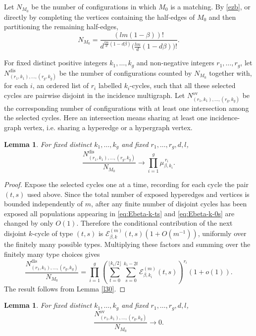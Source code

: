 \documentclass[11pt]{amsart}
\theoremstyle{plain}
\newtheorem{lemma}[theorem]{Lemma}
\numberwithin{equation}{section}
\numberwithin{theorem}{section}
\numberwithin{figure}{section}
\begin{document}
Let \(N_{M_0}\) be the number of configurations in which \(M_0\) is a matching.  By
\eqref{ezb}, or directly by completing the vertices containing the half-edges
of \(M_0\) and then partitioning the remaining half-edges,
\[
  N_{M_0}
  =\frac{(lm(1-\beta))!}
    {d^{\frac{lm}{d}(1-d\beta)}\bigl(\frac{lm}{d}(1-d\beta)\bigr)!}.
\]

For fixed distinct positive integers \(k_1,\ldots,k_g\) and non-negative integers
\(r_1,\ldots,r_g\), let \(N^{\mathrm{dis}}_{(r_1,k_1),\ldots,(r_g,k_g)}\) be the
number of configurations counted by \(N_{M_0}\) together with, for each \(i\), an
ordered list of \(r_i\) labelled \(k_i\)-cycles, such that all these selected cycles
are pairwise disjoint in the incidence multigraph.  Let
\(N^{\mathrm{ov}}_{(r_1,k_1),\ldots,(r_g,k_g)}\) be the corresponding number of
configurations with at least one intersection among the selected cycles.
Here an intersection means sharing at least one incidence-graph vertex, i.e.
sharing a hyperedge or a hypergraph vertex.

\begin{lemma}\label{l31}
For fixed distinct \(k_1,\ldots,k_g\) and fixed \(r_1,\ldots,r_g,d,l\),
\[
  \frac{N^{\mathrm{dis}}_{(r_1,k_1),\ldots,(r_g,k_g)}}{N_{M_0}}
  \longrightarrow
  \prod_{i=1}^g \mu_{\beta,k_i}^{\,r_i}.
\]
\end{lemma}

\begin{proof}
Expose the selected cycles one at a time, recording for each cycle the pair
\((t,s)\) used above.  Since the total number of exposed hyperedges and vertices
is bounded independently of \(m\), after any finite number of disjoint cycles has
been exposed all populations appearing in \eqref{eq:Ebeta-k-ts} and
\eqref{eq:Ebeta-k-0s} are changed by only \(O(1)\).  Therefore the conditional
contribution of the next disjoint \(k\)-cycle of type \((t,s)\) is
\(\mathcal E^{(m)}_{\beta,k}(t,s)(1+O(m^{-1}))\), uniformly over the finitely many
possible types.  Multiplying these factors and summing over the finitely many
type choices gives
\[
  \frac{N^{\mathrm{dis}}_{(r_1,k_1),\ldots,(r_g,k_g)}}{N_{M_0}}
  =\prod_{i=1}^g
   \left(\sum_{t=0}^{\lfloor k_i/2\rfloor}\sum_{s=0}^{k_i-2t}
      \mathcal E^{(m)}_{\beta,k_i}(t,s)\right)^{r_i}(1+o(1)).
\]
The result follows from Lemma \ref{l30}.
\end{proof}

\begin{lemma}\label{l32}
For fixed distinct \(k_1,\ldots,k_g\) and fixed \(r_1,\ldots,r_g,d,l\),
\[
  \frac{N^{\mathrm{ov}}_{(r_1,k_1),\ldots,(r_g,k_g)}}{N_{M_0}}\longrightarrow0.
\]
\end{lemma}
\end{document}
